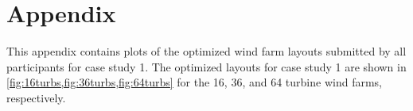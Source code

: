 \documentclass[conf,hidelinks]{new-aiaa} %
\begin{document}
\newpage
\section*{Appendix}
This appendix contains plots of the optimized wind farm layouts submitted by all participants for case study 1. The optimized layouts for case study 1 are shown in \cref{fig:16turbs,fig:36turbs,fig:64turbs} for the 16, 36, and 64 turbine wind farms, respectively.

\begin{figure}[htbp!]
	\centering
\end{figure}
\end{document}
